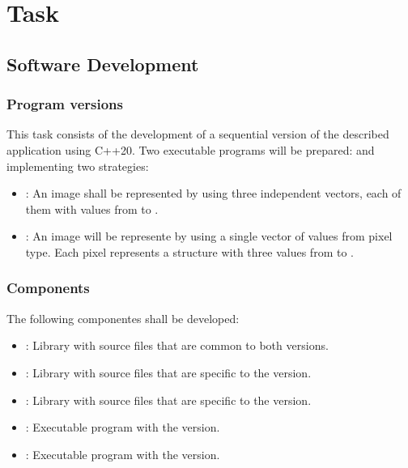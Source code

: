 \section{Task}

\subsection{Software Development}


\subsubsection{Program versions}
\label{sec:tasks:versions}

This task consists of the development of a sequential version
of the described application using C++20.
Two executable programs will be prepared:
 and  
implementing two strategies:

\begin{itemize}
  \item {}:
        An image shall be represented by using three independent vectors,
        each of them with values from  to .
  \item {}:
        An image will be represente by using a single vector of values from pixel type.
        Each pixel represents a structure with three values from  to .
\end{itemize}

\subsubsection{Components}

The following componentes shall be developed:

\begin{itemize}
  \item {}: 
        Library with source files that are common to both versions.

  \item {}: 
        Library with source files that are specific to the  version.

  \item {}:
        Library with source files that are specific to the  version.

  \item {}: 
        Executable program with the  version.

  \item {}: 
        Executable program with the  version.

\end{itemize}

